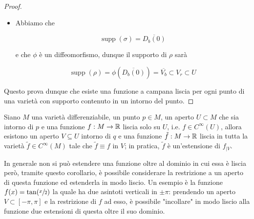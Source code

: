 \begin{proof}
\begin{itemize}
		\item Abbiamo che
		
		\begin{equation}
			\operatorname{supp}(\sigma) = \overline{D_{b}(0)}
		\end{equation}
	
		e che $ \phi $ è un diffeomorfismo, dunque il supporto di $ \rho $ sarà
		
		\begin{equation}
			\operatorname{supp}(\rho) = \phi \left( \overline{D_{b}(0)} \right) = \overline{V_{b}} \subset V_{r} \subset U
		\end{equation}
	\end{itemize}
	
	Questo prova dunque che esiste una funzione a campana liscia per ogni punto di una varietà con supporto contenuto in un intorno del punto.
\end{proof}

\begin{corollary}\label{cor-est-smooth}
	Siano $ M $ una varietà differenziabile, un punto $ p \in M $, un aperto $ U \subset M $ che sia intorno di $ p $ e una funzione $ f : M \to \mathbb{R} $ liscia solo su $ U $, i.e. $ f \in C^{\infty}(U) $, allora esistono un aperto $ V \subseteq U $ intorno di $ q $ e una funzione $ \tilde{f} : M \to \mathbb{R} $ liscia in tutta la varietà $ \tilde{f} \in C^{\infty}(M) $ tale che $ \tilde{f} \equiv f $ in $ V $; in pratica, $ \tilde{f} $ è un'estensione di $ f_{|V} $.
\end{corollary}

In generale non si può estendere una funzione oltre al dominio in cui essa è liscia però, tramite questo corollario, è possibile considerare la restrizione a un aperto di questa funzione ed estenderla in modo liscio. Un esempio è la funzione $ f(x) = \tan(\sfrac{x}{2}) $ la quale ha due asintoti verticali in $ \pm \pi $: prendendo un aperto $ V \subset [-\pi,\pi] $ e la restrizione di $ f $ ad esso, è possibile "incollare" in modo liscio alla funzione due estensioni di questa oltre il suo dominio.

